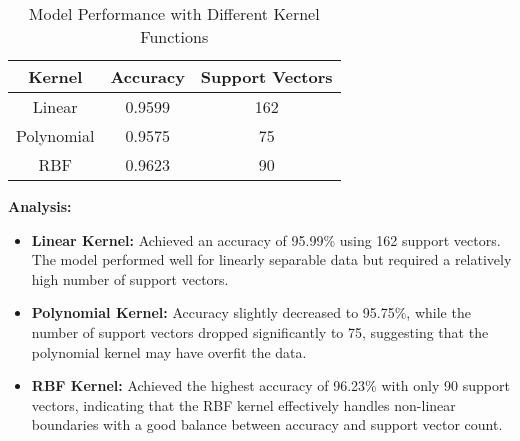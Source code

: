\documentclass[11pt]{article}
\begin{document}
\begin{enumerate}
\begin{enumerate}
\begin{table}[h!]
    \centering
    \begin{tabular}{|c|c|c|}
        \hline
        \textbf{Kernel} & \textbf{Accuracy} & \textbf{Support Vectors} \\
        \hline
        Linear & 0.9599 & 162 \\
        \hline
        Polynomial & 0.9575 & 75 \\
        \hline
        RBF & 0.9623 & 90 \\
        \hline
    \end{tabular}
    \caption{Model Performance with Different Kernel Functions}
\end{table}

\textbf{Analysis:}

\begin{itemize}
    \item \textbf{Linear Kernel:} Achieved an accuracy of 95.99\% using 162 support vectors. The model performed well for linearly separable data but required a relatively high number of support vectors.
    \item \textbf{Polynomial Kernel:} Accuracy slightly decreased to 95.75\%, while the number of support vectors dropped significantly to 75, suggesting that the polynomial kernel may have overfit the data.
    \item \textbf{RBF Kernel:} Achieved the highest accuracy of 96.23\% with only 90 support vectors, indicating that the RBF kernel effectively handles non-linear boundaries with a good balance between accuracy and support vector count.
\end{itemize}



\end{enumerate}


\end{enumerate}
\end{document}
